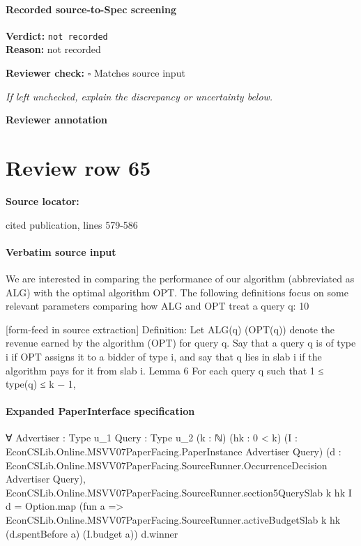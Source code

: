 \documentclass[10pt]{article}
\newcommand{\reviewerbox}{%
  \par\noindent\fbox{\parbox{0.96\linewidth}{\rule{0pt}{0.38in}}}\par
}
\newcommand{\reviewmatch}[1]{%
  \par\noindent\textbf{Reviewer check:} $\square$\; #1\par
  \noindent\emph{If left unchecked, explain the discrepancy or uncertainty below.}\par
}
\begin{document}
\paragraph{Recorded source-to-Spec screening}
\textbf{Verdict:} \texttt{not recorded}
\\
\textbf{Reason:} not recorded
\reviewmatch{Matches source input}
\noindent\textbf{Reviewer annotation}\par
\reviewerbox
\clearpage
\hypertarget{source-claim-fd2f54764512b9fa}{}
\section*{Review row 65}
\textbf{Source locator:} {\footnotesize\raggedright cited publication, lines 579-\allowbreak{}586\par}
\paragraph{Verbatim source input}
\begin{ReviewVerbatim}
We are interested in comparing the performance of our algorithm (abbreviated as ALG) with
the optimal algorithm OPT. The following definitions focus on some relevant parameters comparing how ALG and OPT treat a query q:
10


[form-feed in source extraction]
Definition: Let ALG(q) (OPT(q)) denote the revenue earned by the algorithm (OPT) for
query q. Say that a query q is of type i if OPT assigns it to a bidder of type i, and say that q
lies in slab i if the algorithm pays for it from slab i.
Lemma 6 For each query q such that 1 ≤ type(q) ≤ k − 1,
\end{ReviewVerbatim}


\paragraph{Expanded PaperInterface specification}
\begin{ReviewVerbatim}
∀ {Advertiser : Type u_1} {Query : Type u_2} (k : ℕ) (hk : 0 < k)
  (I : EconCSLib.Online.MSVV07PaperFacing.PaperInstance Advertiser Query)
  (d : EconCSLib.Online.MSVV07PaperFacing.SourceRunner.OccurrenceDecision Advertiser Query),
  EconCSLib.Online.MSVV07PaperFacing.SourceRunner.section5QuerySlab k hk I d =
    Option.map
      (fun a => EconCSLib.Online.MSVV07PaperFacing.SourceRunner.activeBudgetSlab k hk (d.spentBefore a) (I.budget a))
      d.winner
\end{ReviewVerbatim}
\end{document}
